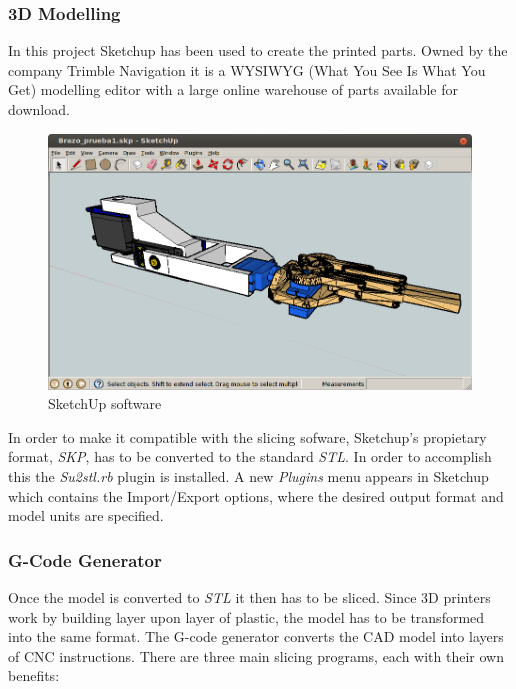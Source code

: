 	\subsubsection{3D Modelling }
	In this project Sketchup has been used to create the printed parts. Owned by the company Trimble Navigation it is a WYSIWYG (What You See Is What You Get) modelling editor with a large online warehouse of parts available for download. \\

		\begin{figure}[H]
			\centering
			\includegraphics[scale=0.4]{images/ProjectComponents/sketchup-arm.png}
			\caption{SketchUp software}
			\label{}
		\end{figure}
		\bigskip

	In order to make it compatible with the slicing sofware, Sketchup's propietary format, \textit{SKP}, has to be converted to the standard \textit{STL}. In order to accomplish this the \textit{Su2stl.rb} plugin is installed. A new \textit{Plugins} menu appears in Sketchup which contains the Import/Export options, where the desired output format and model units are specified.



	\subsubsection{G-Code Generator} 
	Once the model is converted to \textit{STL} it then has to be sliced. Since 3D printers work by building layer upon layer of plastic, the model has to be transformed into the same format. The G-code generator converts the CAD model into layers of CNC instructions. There are three main slicing programs, each with their own benefits:

